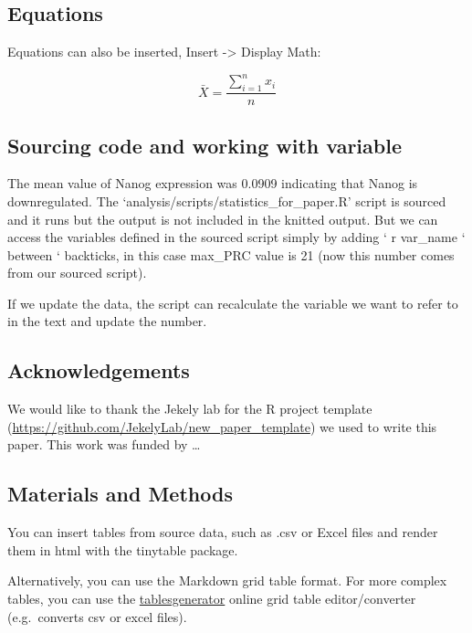 \documentclass[
  11pt,
]{article}
\begin{document}
\subsection{Equations}\label{equations}

Equations can also be inserted, Insert -\textgreater{} Display Math:

\[
\bar{X} = \frac{\sum_{i=1}^{n} x_{i}}{n}
\]

\hfill\break

\subsection{Sourcing code and working with
variable}\label{sourcing-code-and-working-with-variable}

The mean value of Nanog expression was 0.0909 indicating that Nanog is
downregulated. The `analysis/scripts/statistics\_for\_paper.R' script is
sourced and it runs but the output is not included in the knitted
output. But we can access the variables defined in the sourced script
simply by adding ` r var\_name ` between ` backticks, in this case
max\_PRC value is 21 (now this number comes from our sourced script).

If we update the data, the script can recalculate the variable we want
to refer to in the text and update the number.

\subsection{Acknowledgements}\label{acknowledgements}

We would like to thank the Jekely lab for the R project template
(\url{https://github.com/JekelyLab/new_paper_template}) we used to write
this paper. This work was funded by \ldots{}

\subsection{Materials and Methods}\label{materials-and-methods}

You can insert tables from source data, such as .csv or Excel files and
render them in html with the tinytable package.

Alternatively, you can use the Markdown grid table format. For more
complex tables, you can use the
\href{https://www.tablesgenerator.com/markdown_tables}{tablesgenerator}
online grid table editor/converter (e.g.~converts csv or excel files).
\end{document}
